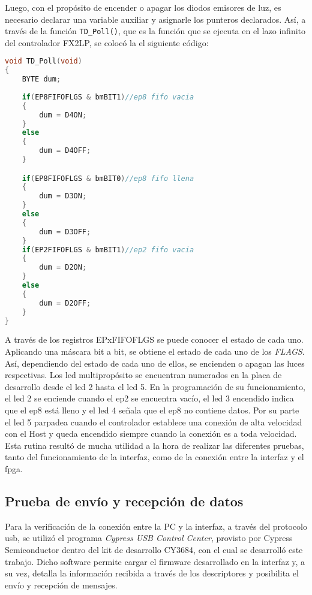 Luego, con el propósito de encender o apagar los diodos emisores de luz, es necesario declarar una variable auxiliar y asignarle los punteros declarados. Así, a través de la función \verb|TD_Poll()|, que es la función que se ejecuta en el lazo infinito del controlador FX2LP, se colocó la el siguiente código:

	\begin{lstlisting}[language=C,backgroundcolor=\color{gray!30}]
void TD_Poll(void)  
{
	BYTE dum;
	
	if(EP8FIFOFLGS & bmBIT1)//ep8 fifo vacia
	{
		dum = D4ON;
	}
	else
	{
		dum = D4OFF;
	}

	if(EP8FIFOFLGS & bmBIT0)//ep8 fifo llena
	{
		dum = D3ON;
	}
	else
	{
		dum = D3OFF;
	}
	if(EP2FIFOFLGS & bmBIT1)//ep2 fifo vacia
	{
		dum = D2ON;
	}
	else
	{
		dum = D2OFF;
	}
}
	\end{lstlisting}

A través de los registros EPxFIFOFLGS se puede conocer el estado de cada uno. Aplicando una máscara bit a bit, se obtiene el estado de cada uno de los \textit{FLAGS}. Así, dependiendo del estado de cada uno de ellos, se encienden o apagan las luces respectivas.
Los \acrshort{led} multipropósito se encuentran numerados en la placa de desarrollo desde el \acrshort{led} 2 hasta el \acrshort{led} 5. En la programación de su funcionamiento, el \acrshort{led} 2 se enciende cuando el \acrshort{ep}2 se encuentra vacío, el \acrshort{led} 3 encendido indica que el \acrshort{ep}8 está lleno y el \acrshort{led} 4 señala que el \acrshort{ep}8 no contiene datos. Por su parte el \acrshort{led} 5 parpadea cuando el controlador establece una conexión de alta velocidad con el Host y queda encendido siempre cuando la conexión es a toda velocidad. 
Esta rutina resultó de mucha utilidad a la hora de realizar las diferentes pruebas, tanto del funcionamiento de la interfaz, como de la conexión entre la interfaz y el \acrshort{fpga}.

\subsection{Prueba de envío y recepción de datos}
	Para la verificación de la conexión entre la PC y la interfaz, a través del protocolo \acrshort{usb}, se utilizó el programa {\it Cypress USB Control Center}, provisto por Cypress Semiconductor dentro del kit de desarrollo CY3684, con el cual se desarrolló este trabajo. Dicho software permite cargar el firmware desarrollado en la interfaz y, a su vez, detalla la información recibida a través de los descriptores y posibilita el envío y recepción de mensajes.
	
